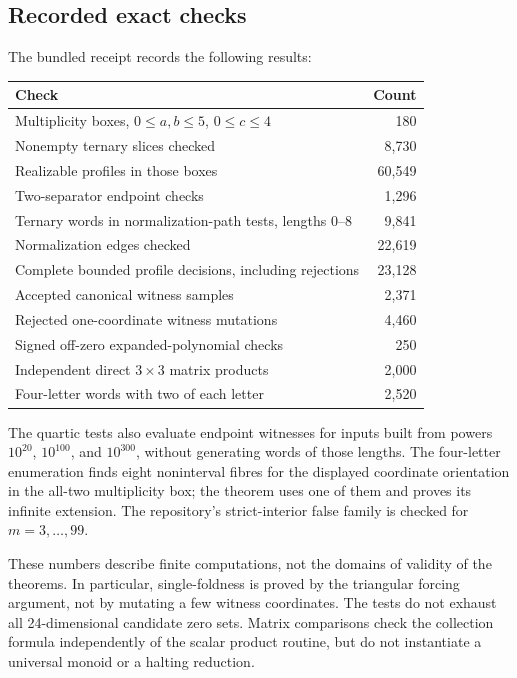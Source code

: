 \documentclass[11pt,letterpaper]{article}
\theoremstyle{definition}
\theoremstyle{remark}
\begin{document}
\subsection{Recorded exact checks}
The bundled receipt records the following results:
\begin{center}
\small
\begin{tabular}{p{.65\linewidth}r}
\toprule
Check & Count\\
\midrule
Multiplicity boxes, $0\le a,b\le5$, $0\le c\le4$ &180\\
Nonempty ternary slices checked &8,730\\
Realizable profiles in those boxes &60,549\\
Two-separator endpoint checks &1,296\\
Ternary words in normalization-path tests, lengths $0$--$8$ &9,841\\
Normalization edges checked &22,619\\
Complete bounded profile decisions, including rejections &23,128\\
Accepted canonical witness samples &2,371\\
Rejected one-coordinate witness mutations &4,460\\
Signed off-zero expanded-polynomial checks &250\\
Independent direct $3\times3$ matrix products &2,000\\
Four-letter words with two of each letter &2,520\\
\bottomrule
\end{tabular}
\end{center}
The quartic tests also evaluate endpoint witnesses for inputs built from powers $10^{20}$, $10^{100}$, and $10^{300}$, without generating words of those lengths. The four-letter enumeration finds eight noninterval fibres for the displayed coordinate orientation in the all-two multiplicity box; the theorem uses one of them and proves its infinite extension. The repository's strict-interior false family is checked for $m=3,\ldots,99$.

These numbers describe finite computations, not the domains of validity of the theorems. In particular, single-foldness is proved by the triangular forcing argument, not by mutating a few witness coordinates. The tests do not exhaust all 24-dimensional candidate zero sets. Matrix comparisons check the collection formula independently of the scalar product routine, but do not instantiate a universal monoid or a halting reduction.
\end{document}
